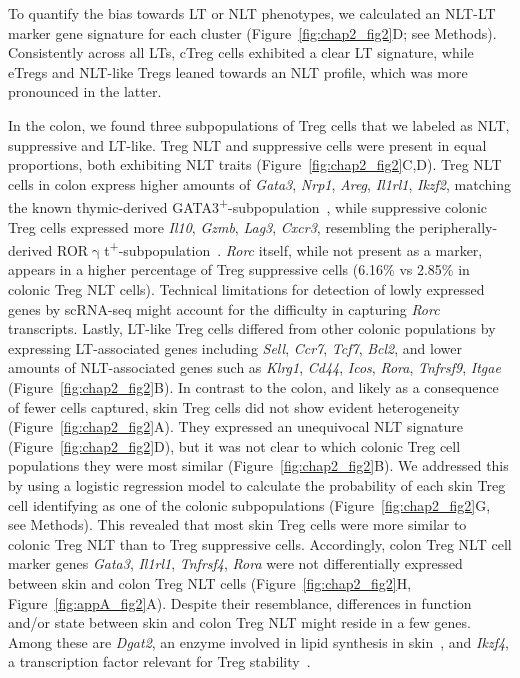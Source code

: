 To quantify the bias towards LT or NLT phenotypes, we calculated an NLT-LT marker gene signature for each cluster (Figure~\ref{fig:chap2_fig2}D; see Methods). Consistently across all LTs, cTreg cells exhibited a clear LT signature, while eTregs and NLT-like Tregs leaned towards an NLT profile, which was more pronounced in the latter. 

In the colon, we found three subpopulations of Treg cells that we labeled as NLT, suppressive and LT-like. Treg NLT and suppressive cells were present in equal proportions, both exhibiting NLT traits (Figure~\ref{fig:chap2_fig2}C,D). Treg NLT cells in colon express higher amounts of \textit{Gata3}, \textit{Nrp1}, \textit{Areg}, \textit{Il1rl1}, \textit{Ikzf2}, matching the known thymic-derived GATA3\textsuperscript{+}-subpopulation~\citep{Schiering2014-ry,Hu2015-yc}, while suppressive colonic Treg cells expressed more \textit{Il10}, \textit{Gzmb}, \textit{Lag3}, \textit{Cxcr3}, resembling the peripherally-derived ROR${\upgamma}$t\textsuperscript{+}-subpopulation~\citep{Ohnmacht2015-mo,Schiering2014-ry,Sefik2015-jq}. \textit{Rorc} itself, while not present as a marker, appears in a higher percentage of Treg suppressive cells (6.16${\%}$ vs 2.85${\%}$ in colonic Treg NLT cells). Technical limitations for detection of lowly expressed genes by scRNA-seq might account for the difficulty in capturing \textit{Rorc} transcripts. Lastly, LT-like Treg cells differed from other colonic populations by expressing LT-associated genes including \textit{Sell}, \textit{Ccr7}, \textit{Tcf7}, \textit{Bcl2}, and lower amounts of NLT-associated genes such as \textit{Klrg1}, \textit{Cd44}, \textit{Icos}, \textit{Rora}, \textit{Tnfrsf9}, \textit{Itgae} (Figure~\ref{fig:chap2_fig2}B).
In contrast to the colon, and likely as a consequence of fewer cells captured, skin Treg cells did not show evident heterogeneity (Figure~\ref{fig:chap2_fig2}A). They expressed an unequivocal NLT signature (Figure~\ref{fig:chap2_fig2}D), but it was not clear to which colonic Treg cell populations they were most similar (Figure~\ref{fig:chap2_fig2}B). We addressed this by using a logistic regression model to calculate the probability of each skin Treg cell identifying as one of the colonic subpopulations (Figure~\ref{fig:chap2_fig2}G, see Methods). This revealed that most skin Treg cells were more similar to colonic Treg NLT than to Treg suppressive cells. Accordingly, colon Treg NLT cell marker genes \textit{Gata3}, \textit{Il1rl1}, \textit{Tnfrsf4}, \textit{Rora} were not differentially expressed between skin and colon Treg NLT cells (Figure~\ref{fig:chap2_fig2}H, Figure~\ref{fig:appA_fig2}A). Despite their resemblance, differences in function and/or state between skin and colon Treg NLT might reside in a few genes. Among these are \textit{Dgat2}, an enzyme involved in lipid synthesis in skin~\citep{Fagerberg2014-pj}, and \textit{Ikzf4}, a transcription factor relevant for Treg stability~\citep{Sharma2013-ou}.

